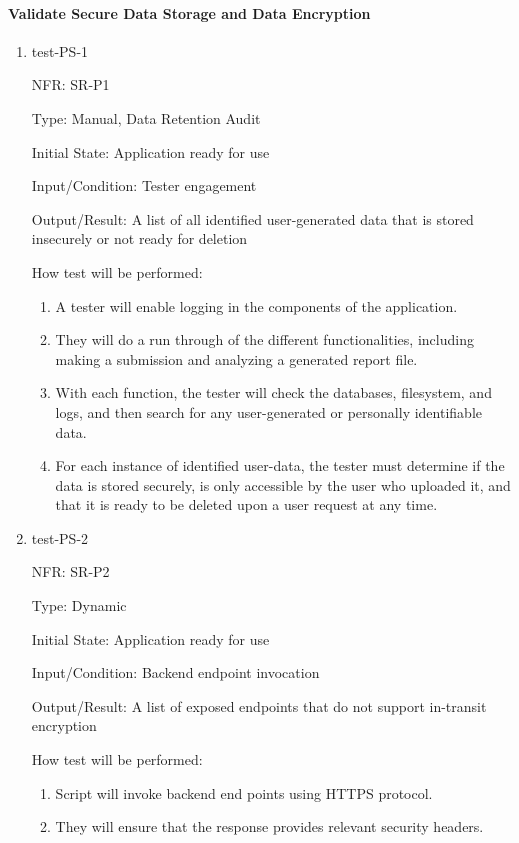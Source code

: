 \documentclass[12pt, titlepage]{article}
\begin{document}
\paragraph{Validate Secure Data Storage and Data Encryption}
\begin{enumerate}
  \item{test-PS-1}
  
  NFR: SR-P1

  Type: Manual, Data Retention Audit

  Initial State: Application ready for use

  Input/Condition: Tester engagement

  Output/Result: A list of all identified user-generated data that is stored insecurely or not ready for deletion

  How test will be performed:
  \begin{enumerate}
    \item A tester will enable logging in the components of the application.
    \item They will do a run through of the different functionalities, including 
    making a submission and analyzing a generated report file.
    \item With each function, the tester will check the databases, filesystem,
    and logs, and then search for any user-generated or personally identifiable data.
    \item For each instance of identified user-data, the tester must determine
    if the data is stored securely, is only accessible by the user who uploaded
    it, and that it is ready to be deleted upon a user request at any time.
  \end{enumerate}


  \item{test-PS-2}
  
  NFR: SR-P2 

  Type: Dynamic

  Initial State: Application ready for use

  Input/Condition: Backend endpoint invocation

  Output/Result: A list of exposed endpoints that do not support in-transit encryption

  How test will be performed:
  \begin{enumerate}
    \item Script will invoke backend end points using HTTPS protocol.
    \item They will ensure that the response provides relevant security headers.
  \end{enumerate}



\end{enumerate}
\end{document}
